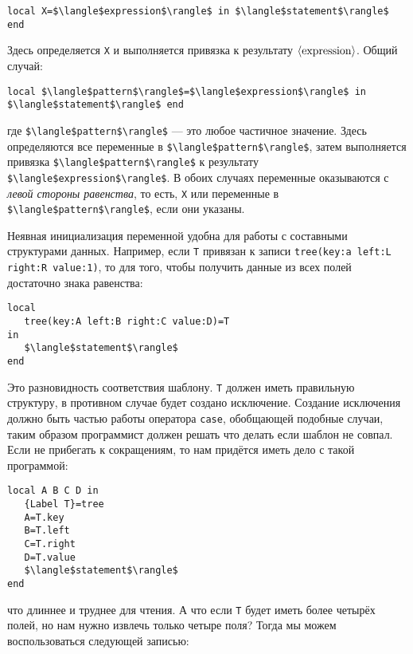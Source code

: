 \begin{lstlisting}
local X=$\langle$expression$\rangle$ in $\langle$statement$\rangle$ end
\end{lstlisting}

Здесь определяется \lstinline|X| и выполняется привязка к результату $\langle \text{\lstinline|expression|} \rangle$. Общий случай:

\begin{lstlisting}
local $\langle$pattern$\rangle$=$\langle$expression$\rangle$ in $\langle$statement$\rangle$ end
\end{lstlisting}

где \lstinline|$\langle$pattern$\rangle$| --- это любое частичное значение. Здесь определяются все переменные в \lstinline|$\langle$pattern$\rangle$|, затем выполняется привязка \lstinline|$\langle$pattern$\rangle$| к результату \lstinline|$\langle$expression$\rangle$|. В обоих случаях переменные оказываются с \emph{левой стороны равенства}, то есть, \lstinline|X| или переменные в \lstinline|$\langle$pattern$\rangle$|, если они указаны.

Неявная инициализация переменной удобна для работы с составными структурами данных. Например, если \lstinline|T| привязан к записи \lstinline|tree(key:a left:L right:R value:1)|, то для того, чтобы получить данные из всех полей достаточно знака равенства:

\begin{lstlisting}
local
   tree(key:A left:B right:C value:D)=T
in
   $\langle$statement$\rangle$
end
\end{lstlisting}

Это разновидность соответствия шаблону. \lstinline|T| должен иметь правильную структуру, в противном случае будет создано исключение. Создание исключения должно быть частью работы оператора \lstinline|case|, обобщающей подобные случаи, таким образом программист должен решать что делать если шаблон не совпал. Если не прибегать к сокращениям, то нам придётся иметь дело с такой программой:

\begin{lstlisting}
local A B C D in
   {Label T}=tree
   A=T.key
   B=T.left
   C=T.right
   D=T.value
   $\langle$statement$\rangle$
end
\end{lstlisting}

что длиннее и труднее для чтения. А что если \lstinline|T| будет иметь более четырёх полей, но нам нужно извлечь только четыре поля? Тогда мы можем воспользоваться следующей записью:

